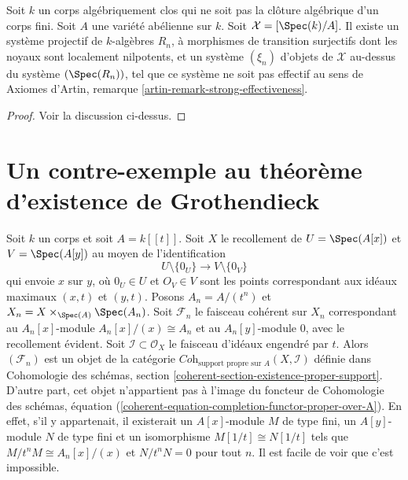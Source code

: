 \begin{lemma}
\label{lemma-non-formal-effectiveness}
Soit $k$ un corps algébriquement clos qui ne soit pas la clôture
algébrique d'un corps fini. Soit $A$ une variété abélienne sur $k$.
Soit $\mathcal{X} = [\Spec(k)/A]$.
Il existe un système projectif de $k$-algèbres $R_n$,
à morphismes de transition surjectifs dont les noyaux sont localement nilpotents,
et un système $(\xi_n)$ d'objets de $\mathcal{X}$ au-dessus du système
$(\Spec(R_n))$, tel que ce système ne soit pas effectif
au sens de Axiomes d'Artin, remarque \ref{artin-remark-strong-effectiveness}.
\end{lemma}

\begin{proof}
Voir la discussion ci-dessus.
\end{proof}








\section{Un contre-exemple au théorème d'existence de Grothendieck}
\label{section-Grothendieck-existence}

\noindent
Soit $k$ un corps et soit $A = k[[t]]$. Soit $X$ le recollement de
$U = \Spec(A[x])$ et $V = \Spec(A[y])$ au moyen de l'identification
$$
U \setminus \{0_U\} \longrightarrow V \setminus \{0_V\}
$$
qui envoie $x$ sur $y$, où $0_U \in U$ et $O_V \in V$ sont les points
correspondant aux idéaux maximaux $(x, t)$ et $(y, t)$. Posons
$A_n = A/(t^n)$ et $X_n = X \times_{\Spec(A)} \Spec(A_n)$.
Soit $\mathcal{F}_n$ le faisceau cohérent sur $X_n$
correspondant au $A_n[x]$-module $A_n[x]/(x) \cong A_n$
et au $A_n[y]$-module $0$, avec le recollement évident.
Soit $\mathcal{I} \subset \mathcal{O}_X$ le faisceau
d'idéaux engendré par $t$. Alors $(\mathcal{F}_n)$ est un objet de
la catégorie $\textit{Coh}_{\text{support propre sur } A}(X, \mathcal{I})$
définie dans
Cohomologie des schémas, section \ref{coherent-section-existence-proper-support}.
D'autre part, cet objet n'appartient pas à l'image du
foncteur
de Cohomologie des schémas,
équation (\ref{coherent-equation-completion-functor-proper-over-A}).
En effet, s'il y appartenait, il existerait un $A[x]$-module $M$ de type fini,
un $A[y]$-module $N$ de type fini et un isomorphisme $M[1/t] \cong N[1/t]$
tels que $M/t^nM \cong A_n[x]/(x)$ et $N/t^nN = 0$ pour tout $n$.
Il est facile de voir que c'est impossible.

